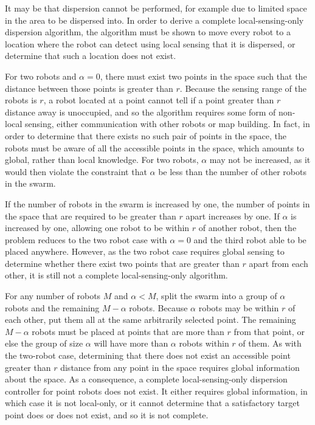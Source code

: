 It may be that dispersion cannot be performed, for example due to limited space in the area to be dispersed into. 
In order to derive a complete local-sensing-only dispersion algorithm, the algorithm must be shown to move every robot to a location where the robot can detect using local sensing that it is dispersed, or determine that such a location does not exist.

For two robots and $\alpha = 0$, there must exist two points in the space such that the distance between those points is greater than $r$. 
Because the sensing range of the robots is $r$, a robot located at a point cannot tell if a point greater than $r$ distance away is unoccupied, and so the algorithm requires some form of non-local sensing, either communication with other robots or map building. 
In fact, in order to determine that there exists no such pair of points in the space, the robots must be aware of all the accessible points in the space, which amounts to global, rather than local knowledge. %
For two robots, $\alpha$ may not be increased, as it would then violate the constraint that $\alpha$ be less than the number of other robots in the swarm. 

If the number of robots in the swarm is increased by one, the number of points in the space that are required to be greater than $r$ apart increases by one. 
If $\alpha$ is increased by one, allowing one robot to be within $r$ of another robot, then the problem reduces to the two robot case with $\alpha=0$ and the third robot able to be placed anywhere. 
However, as the two robot case requires global sensing to determine whether there exist two points that are greater than $r$ apart from each other, it is still not a complete local-sensing-only algorithm. 

For any number of robots $M$ and $\alpha < M$, split the swarm into a group of $\alpha$ robots and the remaining $M - \alpha$ robots. 
Because $\alpha$ robots may be within $r$ of each other, put them all at the same arbitrarily selected point. 
The remaining $M - \alpha$ robots must be placed at points that are more than $r$ from that point, or else the group of size $\alpha$ will have more than $\alpha$ robots within $r$ of them.
As with the two-robot case, determining that there does not exist an accessible point greater than $r$ distance from any point in the space requires global information about the space. 
As a consequence, a complete local-sensing-only dispersion controller for point robots does not exist.
It either requires global information, in which case it is not local-only, or it cannot determine that a satisfactory target point does or does not exist, and so it is not complete.

